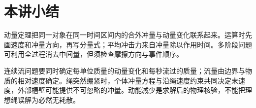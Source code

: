 \section{本讲小结}
动量定理把同一对象在同一时间区间内的合外冲量与动量变化联系起来。运算时先画速度和冲量方向，再写分量式；平均冲击力来自冲量除以作用时间。多阶段问题可利用全过程消去中间量，但须检查摩擦方向与事件顺序。

连续流问题要同时确定每单位质量的动量变化和每秒流过的质量；流量由边界与物质的相对速度确定。绳突然绷紧时，个体冲量方程与沿绳速度约束共同决定末速度，外部槽壁可能提供不可忽略的冲量。动能减少是求解后的物理核验，不能把理想绳误解为必然无耗散。
